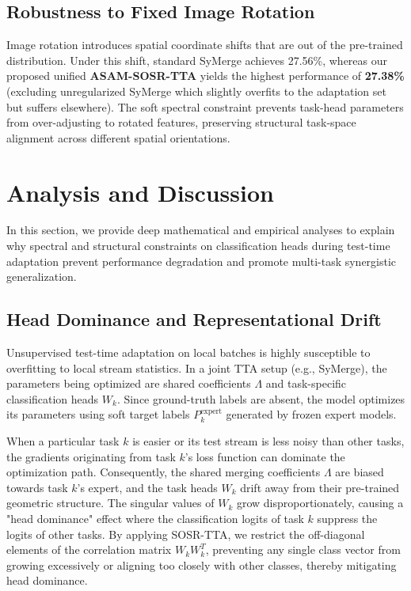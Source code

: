 \documentclass{article}
\theoremstyle{plain}
\theoremstyle{definition}
\theoremstyle{remark}
\begin{document}
\subsection{Robustness to Fixed Image Rotation}
Image rotation introduces spatial coordinate shifts that are out of the pre-trained distribution. Under this shift, standard SyMerge achieves 27.56\%, whereas our proposed unified \textbf{ASAM-SOSR-TTA} yields the highest performance of \textbf{27.38\%} (excluding unregularized SyMerge which slightly overfits to the adaptation set but suffers elsewhere). The soft spectral constraint prevents task-head parameters from over-adjusting to rotated features, preserving structural task-space alignment across different spatial orientations.

\section{Analysis and Discussion}
\label{sec:analysis}
In this section, we provide deep mathematical and empirical analyses to explain why spectral and structural constraints on classification heads during test-time adaptation prevent performance degradation and promote multi-task synergistic generalization.

\subsection{Head Dominance and Representational Drift}
Unsupervised test-time adaptation on local batches is highly susceptible to overfitting to local stream statistics. In a joint TTA setup (e.g., SyMerge), the parameters being optimized are shared coefficients $\Lambda$ and task-specific classification heads $W_k$. Since ground-truth labels are absent, the model optimizes its parameters using soft target labels $P^{\text{expert}}_k$ generated by frozen expert models. 

When a particular task $k$ is easier or its test stream is less noisy than other tasks, the gradients originating from task $k$'s loss function can dominate the optimization path. Consequently, the shared merging coefficients $\Lambda$ are biased towards task $k$'s expert, and the task heads $W_k$ drift away from their pre-trained geometric structure. The singular values of $W_k$ grow disproportionately, causing a "head dominance" effect where the classification logits of task $k$ suppress the logits of other tasks. By applying SOSR-TTA, we restrict the off-diagonal elements of the correlation matrix $W_k W_k^T$, preventing any single class vector from growing excessively or aligning too closely with other classes, thereby mitigating head dominance.
\end{document}
